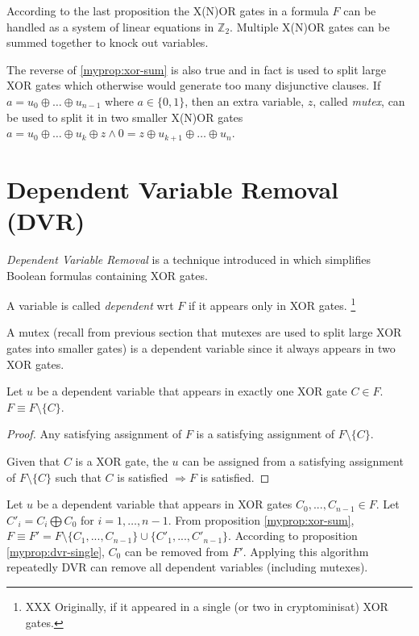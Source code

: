 According to the last proposition the X(N)OR gates in a formula $F$ can
be handled as a system of linear equations in $\mathbb{Z}_2$. Multiple X(N)OR
gates can be summed together to knock out variables.

The reverse of \ref{myprop:xor-sum} is also true and in fact is used
to split large XOR gates which otherwise would generate too many
disjunctive clauses. If $a = u_0 \oplus \ldots \oplus u_{n-1}$ where
$a \in \{0, 1\}$, then an extra variable, $z$, called \emph{mutex}, can
be used to split it in two smaller X(N)OR gates 
$a = u_0 \oplus \ldots \oplus u_{k} \oplus z \land 0 = z \oplus u_{k + 1} \oplus
\ldots \oplus u_{n}$.

\section{Dependent Variable Removal (DVR)}

\emph{Dependent Variable Removal} is a technique introduced in
\cite{mine:march} which simplifies Boolean formulas containing XOR gates.

\begin{mydef}
  A variable is called \emph{dependent} wrt $F$ if it appears only in XOR gates.
  \footnote{XXX Originally, if it appeared in a single (or two in cryptominisat) XOR gates.}
\end{mydef}

A mutex (recall from previous section that mutexes are used to split
large XOR gates into smaller gates) is a dependent variable since it
always appears in two XOR gates.

\begin{myprop}[DVR]
  \label{myprop:dvr-single}
  Let $u$ be a dependent variable that appears in exactly one XOR gate
  $C \in F$. $F \equiv F \setminus \{C\}$.
\end{myprop}

\begin{proof}
  Any satisfying assignment of $F$ is a satisfying assignment of $F
  \setminus \{ C \}$.

  Given that $C$ is a XOR gate, the $u$ can be assigned from
  a satisfying assignment of $F \setminus \{C\}$ such that $C$ is
  satisfied $\Rightarrow F$ is satisfied.
\end{proof}


Let $u$ be a dependent variable that appears in XOR gates $C_{0},
..., C_{n-1} \in F$. Let $C'_i = C_i \bigoplus C_0$ for $i = 1,
\ldots, n-1$.  From proposition \ref{myprop:xor-sum}, $F \equiv F'
= F \setminus \{C_{1}, ..., C_{n-1}\} \cup \{C'_{1}, ..., C'_{n-1}\}$.
According to proposition \ref{myprop:dvr-single}, $C_0$ can be removed
from $F'$. Applying this algorithm repeatedly DVR can remove all dependent
variables (including mutexes).


